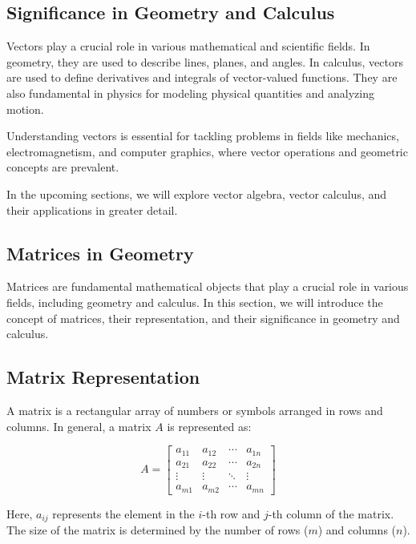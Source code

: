 \documentclass[a4paper,12pt]{book}
\newcounter{problem}
\begin{document}
\subsection{Significance in Geometry and Calculus}

Vectors play a crucial role in various mathematical and scientific fields. In geometry, they are used to describe lines, planes, and angles. In calculus, vectors are used to define derivatives and integrals of vector-valued functions. They are also fundamental in physics for modeling physical quantities and analyzing motion.

Understanding vectors is essential for tackling problems in fields like mechanics, electromagnetism, and computer graphics, where vector operations and geometric concepts are prevalent.

In the upcoming sections, we will explore vector algebra, vector calculus, and their applications in greater detail.

\subsection{Matrices in Geometry}
\label{subsec:matrices_in_geometry}

Matrices are fundamental mathematical objects that play a crucial role in various fields, including geometry and calculus. In this section, we will introduce the concept of matrices, their representation, and their significance in geometry and calculus.

\subsection{Matrix Representation}

A matrix is a rectangular array of numbers or symbols arranged in rows and columns. In general, a matrix $A$ is represented as:

\[
A = \begin{bmatrix}
a_{11} & a_{12} & \cdots & a_{1n} \\
a_{21} & a_{22} & \cdots & a_{2n} \\
\vdots & \vdots & \ddots & \vdots \\
a_{m1} & a_{m2} & \cdots & a_{mn}
\end{bmatrix}
\]

Here, $a_{ij}$ represents the element in the $i$-th row and $j$-th column of the matrix. The size of the matrix is determined by the number of rows ($m$) and columns ($n$).
\end{document}
